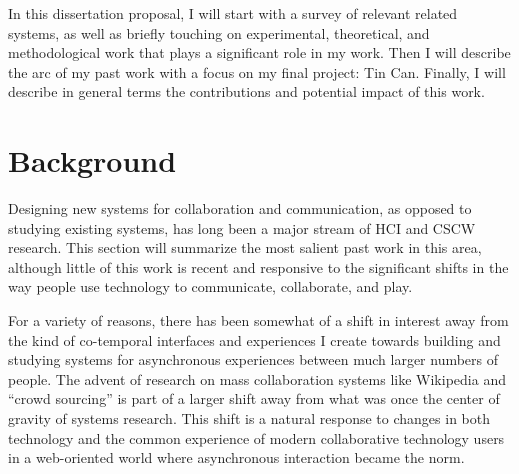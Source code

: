 \documentclass{tufte-handout}
\begin{document}


In this dissertation proposal, I will start with a survey of relevant related systems, as well as briefly touching on experimental, theoretical, and methodological work that plays a significant role in my work. Then I will describe the arc of my past work with a focus on my final project: Tin Can. Finally, I will describe in general terms the contributions and potential impact of this work.



\section{Background}

Designing new systems for collaboration and communication, as opposed to studying existing systems, has long been a major stream of HCI and CSCW research. This section will summarize the most salient past work in this area, although little of this work is recent and responsive to the significant shifts in the way people use technology to communicate, collaborate, and play. 

For a variety of reasons, there has been somewhat of a shift in interest away from the kind of co-temporal interfaces and experiences I create towards building and studying systems for asynchronous experiences between much larger numbers of people. The advent of research on mass collaboration systems like Wikipedia \citet{kittur} and ``crowd sourcing'' \citet{bernstein} is part of a larger shift away from what was once the center of gravity of systems research. This shift is a natural response to changes in both technology and the common experience of modern collaborative technology users in a web-oriented world where asynchronous interaction became the norm.
\end{document}
